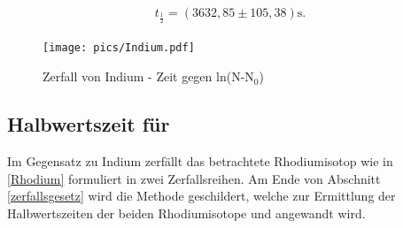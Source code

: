 \begin{align}
 t_{\frac12} = (3632,85 \pm 105,38) \text{s}.
 \label{in}
\end{align}

\begin{figure}[h]
	\texttt{[image: pics/Indium.pdf]}
	\caption{Zerfall von Indium - Zeit gegen ln(N-N$_0$)}
\end{figure}

\subsection{Halbwertszeit für }
Im Gegensatz zu Indium zerfällt das betrachtete Rhodiumisotop wie in \eqref{Rhodium} formuliert in zwei Zerfallsreihen.
Am Ende von Abschnitt \ref{zerfallsgesetz} wird die Methode geschildert, welche zur Ermittlung der Halbwertszeiten der beiden
Rhodiumisotope  und  angewandt wird.

